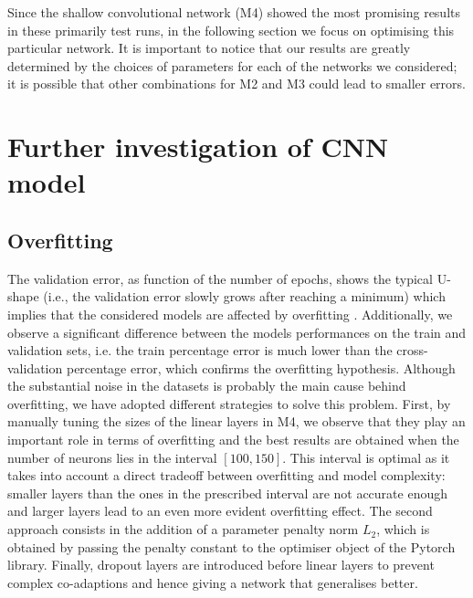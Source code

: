 \documentclass{article}
\begin{document}
Since the shallow convolutional network (M4) showed the most promising results in these primarily test runs, in the following section we focus on optimising this particular network. 
It is important to notice that our results  are greatly determined by the choices of parameters for each of the networks we considered; it is possible that other combinations for M2 and M3 could lead to smaller errors.


  \section{Further investigation of CNN model}\label{sec_themodel}
\subsection{Overfitting}
 The validation error, as function of the number of epochs, shows the typical U-shape (i.e., the  validation error slowly grows after reaching a minimum) which implies  that the considered models are affected by overfitting \cite{goodfellow2016deep}. 
 Additionally, we observe a  significant difference between the models performances on the train and validation sets, i.e. the train percentage error is much lower than the cross-validation percentage error, which confirms the overfitting hypothesis. 
Although the substantial noise  in the datasets is probably the main cause behind overfitting, we have adopted different strategies to solve this problem. 
First, by manually tuning the sizes of the linear layers in M4, we observe that they play an important role in terms of overfitting and the best results are obtained when the number of neurons lies in the interval $[100,150]$. 
This interval is optimal as it takes into account a direct tradeoff between overfitting and model complexity: smaller layers  than the ones in the prescribed interval are not accurate enough and larger layers lead to an even  more evident overfitting effect. 
The second approach consists in the addition of a parameter penalty norm $L_2$, which is obtained by passing the penalty constant to the optimiser object of the Pytorch library. 
Finally, dropout layers are introduced before linear layers to prevent complex co-adaptions and hence giving a network that generalises better.
\end{document}
